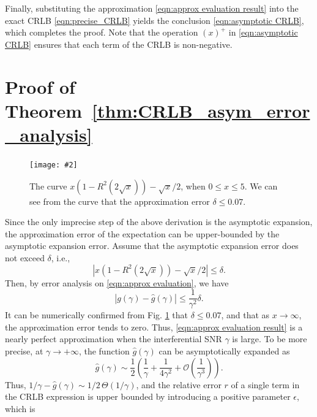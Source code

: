 \documentclass[journal,twocolumn]{IEEEtran}
\theoremstyle{nonumberplain}
\newcommand{\myincludegraphics}[2][width=1\linewidth]{\texttt{[image: \#2]}}
\newcommand{\myincludegraphics}[2][width=0.8\linewidth]{\texttt{[image: \#2]}}
\begin{document}
    Finally, substituting the approximation \eqref{eqn:approx evaluation result} into the exact CRLB \eqref{eqn:precise_CRLB} yields the conclusion \eqref{eqn:asymptotic CRLB}, which completes the proof. Note that the operation $(x)^+$ in \eqref{eqn:asymptotic CRLB} ensures that each term of the CRLB is non-negative. 

\section{Proof of \textbf{Theorem~\ref{thm:CRLB_asym_error_analysis}}}
\label{Proof of Theorem 3}
    \begin{figure}[t]
        \centering
        \myincludegraphics{figures/asymptotic_expansion.pdf}
        \caption{The curve $x(1-R^2(2\sqrt{x}))-\sqrt{x}/2$, when $0\leq x\leq 5$. We can see from the curve that the approximation error $\delta \leq 0.07$.}
        \label{fig:asymptotic_expansion}
    \end{figure}
    Since the only imprecise step of the above derivation is the asymptotic expansion, the approximation error of the expectation can be upper-bounded by the asymptotic expansion error. Assume that the asymptotic expansion error does not exceed $\delta$, i.e.,
    \begin{equation}
        \left\vert x\left(1-R^2(2\sqrt{x})\right)-\sqrt{x}/2 \right\vert \leq \delta.
        \label{eqn:asymptotic error}
    \end{equation}
    Then, by error analysis on \eqref{eqn:approx evaluation}, we have 
    \begin{equation}
        \left| g(\gamma) - \hat{g}(\gamma)\right| \leq \frac{1}{\gamma^2} \delta. 
    \end{equation}
    It can be numerically confirmed from Fig. \ref{fig:asymptotic_expansion} that $\delta \leq 0.07$, and that as $x\to \infty$, the approximation error tends to zero. Thus, \eqref{eqn:approx evaluation result} is a nearly perfect approximation when the interferential SNR $\gamma$ is large. To be more precise, at $\gamma \to +\infty$, the function $\hat{g}(\gamma)$ can be asymptotically expanded as
    \begin{equation}
        \hat{g}(\gamma) \sim \frac{1}{2}\left(\frac{1}{\gamma} + \frac{1}{4\gamma^2} + \mathcal O(\frac{1}{\gamma^3})\right).
        \label{eqn:g hat asymptotic expansion}
    \end{equation}
    Thus, $1/\gamma - \hat{g}(\gamma) \sim 1/2\,\Theta (1/\gamma)$, and the relative error $r$ of a single term in the CRLB expression is upper bounded by introducing a positive parameter $\epsilon$, which is
\end{document}

